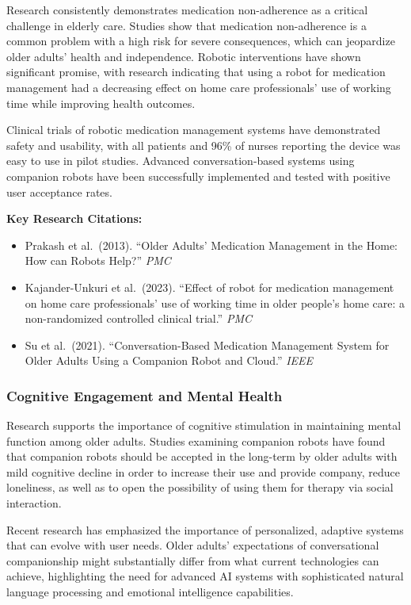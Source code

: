 \documentclass[
  letterpaper,
  DIV=11,
  numbers=noendperiod]{scrartcl}
\providecommand{\tightlist}{%
  \setlength{\itemsep}{0pt}\setlength{\parskip}{0pt}}\usepackage{longtable,booktabs,array}
\begin{document}
Research consistently demonstrates medication non-adherence as a
critical challenge in elderly care. Studies show that medication
non-adherence is a common problem with a high risk for severe
consequences, which can jeopardize older adults' health and
independence. Robotic interventions have shown significant promise, with
research indicating that using a robot for medication management had a
decreasing effect on home care professionals' use of working time while
improving health outcomes.

Clinical trials of robotic medication management systems have
demonstrated safety and usability, with all patients and 96\% of nurses
reporting the device was easy to use in pilot studies. Advanced
conversation-based systems using companion robots have been successfully
implemented and tested with positive user acceptance rates.

\textbf{Key Research Citations:}

\begin{itemize}
\tightlist
\item
  Prakash et al.~(2013). ``Older Adults' Medication Management in the
  Home: How can Robots Help?'' \emph{PMC}
\item
  Kajander-Unkuri et al.~(2023). ``Effect of robot for medication
  management on home care professionals' use of working time in older
  people's home care: a non-randomized controlled clinical trial.''
  \emph{PMC}
\item
  Su et al.~(2021). ``Conversation-Based Medication Management System
  for Older Adults Using a Companion Robot and Cloud.'' \emph{IEEE}
\end{itemize}

\subsubsection{Cognitive Engagement and Mental
Health}\label{cognitive-engagement-and-mental-health}

Research supports the importance of cognitive stimulation in maintaining
mental function among older adults. Studies examining companion robots
have found that companion robots should be accepted in the long-term by
older adults with mild cognitive decline in order to increase their use
and provide company, reduce loneliness, as well as to open the
possibility of using them for therapy via social interaction.

Recent research has emphasized the importance of personalized, adaptive
systems that can evolve with user needs. Older adults' expectations of
conversational companionship might substantially differ from what
current technologies can achieve, highlighting the need for advanced AI
systems with sophisticated natural language processing and emotional
intelligence capabilities.
\end{document}
